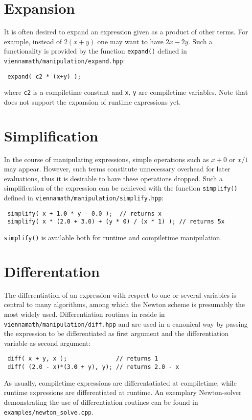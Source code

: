  \section{Expansion}
It is often desired to expand an expression given as a product of other terms. For example, instead of $2(x+y)$ one may want to have $2x - 2y$.
Such a functionality is provided by the function \lstinline|expand()| defined in \lstinline|viennamath/manipulation/expand.hpp|:
\begin{lstlisting}
 expand( c2 * (x+y) );
\end{lstlisting}
where \lstinline|c2| is a compiletime constant and \lstinline|x|, \lstinline|y| are compiletime variables.
Note that {\ViennaMathversion} does not support the expansion of runtime expressions yet.




 \section{Simplification}
In the course of manipulating expressions, simple operations such as $x+0$ or $x/1$ may appear.
However, such terms constitute unnecessary overhead for later evaluations, thus it is desirable to have these operations dropped.
Such a simplification of the expression can be achieved with the function \lstinline|simplify()| defined in \lstinline|viennamath/manipulation/simplify.hpp|:
\begin{lstlisting}
 simplify( x + 1.0 * y - 0.0 );  // returns x
 simplify( x * (2.0 + 3.0) + (y * 0) / (x * 1) ); // returns 5x
\end{lstlisting}
\lstinline|simplify()| is available both for runtime and compiletime manipulation.


 \section{Differentation}
The differentiation of an expression with respect to one or several variables is central to many algorithms, among which the Newton scheme is presumably the
most widely used. Differentiation routines in {\ViennaMath} reside in \lstinline|viennamath/manipulation/diff.hpp| and are used in a canonical way by passing
the expression to be differentiated as first argument and the differentiation variable as second argument:
\begin{lstlisting}
 diff( x + y, x );              // returns 1
 diff( (2.0 - x)*(3.0 + y), y); // returns 2.0 - x
\end{lstlisting}
As usually, compiletime expressions are differentatiated at compiletime, while runtime expressions are differentiated at runtime.
An exemplary Newton-solver demonstrating the use of differentiation routines can be found in \lstinline|examples/newton_solve.cpp|.


